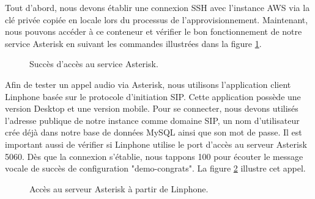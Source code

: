 Tout d'abord, nous devons établir une connexion SSH avec l'instance AWS via la clé privée copiée en locale lors du processus de l'approvisionnement. Maintenant, nous pouvons accéder à ce conteneur et vérifier le bon fonctionnement de notre service Asterisk en suivant les commandes illustrées dans la figure \ref{fig:ok-asterisk}. 
\begin{figure}[H]
        \centering
        \caption{Succès d'accès au service Asterisk.}
        \label{fig:ok-asterisk}
\end{figure}
Afin de tester un appel audio via Asterisk, nous utilisons l'application client Linphone basée sur le protocole d'initiation SIP.
Cette application possède une version Desktop et une version mobile. Pour se connecter, nous devons utilisés l'adresse publique de notre instance comme domaine SIP, un nom d'utilisateur crée déjà dans notre base de données MySQL ainsi que son mot de passe. Il est important aussi de vérifier si Linphone utilise le port d'accès au serveur Asterisk 5060. Dès que la connexion s'établie, nous tappons 100 pour écouter le message vocale de succès de configuration "demo-congrats".
La figure \ref{fig:ok-linphone} illustre cet appel.
\begin{figure}[H]
        \centering
        \caption{Accès au serveur Asterisk à partir de Linphone.}
        \label{fig:ok-linphone}
\end{figure}

